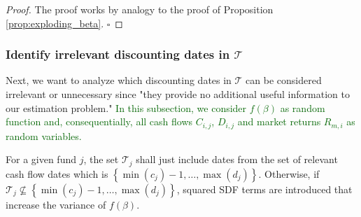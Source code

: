 \begin{proof}
	The proof works by analogy to the proof of Proposition \ref{prop:exploding_beta}.
	$\square$
\end{proof}


\subsubsection{Identify irrelevant discounting dates in $\mathcal{T}$}


Next, we want to analyze which discounting dates in $\mathcal{T}$ can be considered irrelevant or unnecessary since "they provide no additional useful information to our estimation problem."
\textcolor{darkgreen}{
	In this subsection, we consider $f(\beta)$ as random function and, consequentially, all cash flows $C_{i,j}$, $D_{i,j}$ and market returns $R_{m,i}$ as random variables.
}

\begin{lemma}
	For a given fund $j$, the set $\mathcal{T}_j$ shall just include dates from the set of relevant cash flow dates which is $\left\{ \min (c_j) - 1, \dots, \max (d_j) \right\}$.
	Otherwise, if $\mathcal{T}_j \nsubseteq \left\{ \min (c_j) - 1, \dots, \max (d_j) \right\}$, squared SDF terms are introduced that increase the variance of $f(\beta)$.
\end{lemma}


